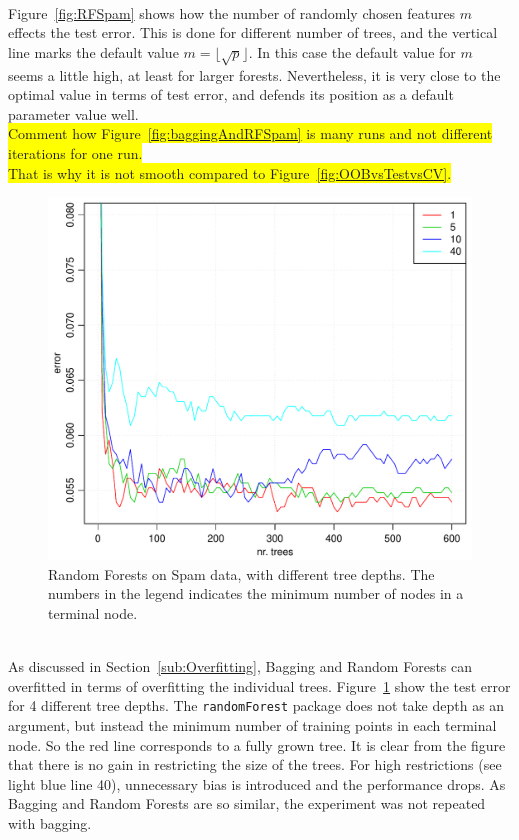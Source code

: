 \\
Figure~\ref{fig:RFSpam} shows how the number of randomly chosen features $m$ effects the test error. This is done for different number of trees, and the vertical line marks the default value $m = \lfloor \sqrt{p} \rfloor$. In this case the default value for $m$ seems a little high, at least for larger forests. Nevertheless, it is very close to the optimal value in terms of test error, and defends its position as a default parameter value well. 
\\\colorbox{yellow}{Comment how Figure~\ref{fig:baggingAndRFSpam} is many runs and not different iterations for one run.}
\\\colorbox{yellow}{That is why it is not smooth compared to Figure~\ref{fig:OOBvsTestvsCV}.}
\\
\begin{figure}[htpb]
\begin{center}
    \includegraphics[scale=0.5]{./figures/RFTreeDepth.pdf}
\end{center}
\caption{Random Forests on Spam data, with different tree depths. The numbers in the legend indicates the minimum number of nodes in a terminal node.}
\label{fig:RFTreeDepth}
\end{figure}
\\
As discussed in Section~\ref{sub:Overfitting}, Bagging and Random Forests can overfitted in terms of overfitting the individual trees. Figure~\ref{fig:RFTreeDepth} show the test error for 4 different tree depths. The \verb+randomForest+ package does not take depth as an argument, but instead the minimum number of training points in each terminal node. So the red line corresponds to a fully grown tree. It is clear from the figure that there is no gain in restricting the size of the trees. For high restrictions (see light blue line 40), unnecessary bias is introduced and the performance drops.  As Bagging and Random Forests are so similar, the experiment was not repeated with bagging.
